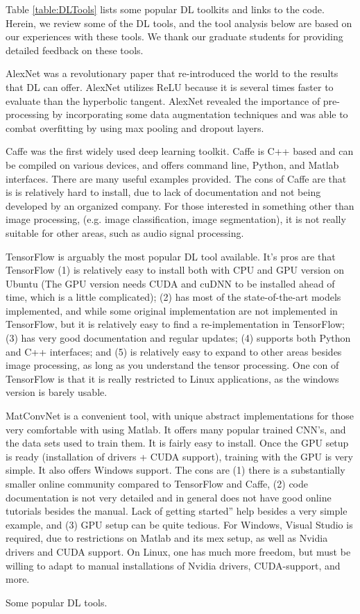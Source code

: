 \documentclass[12pt]{spieman}
\begin{document}
\begin{spacing}{1}
Table \ref{table:DLTools} lists some popular DL toolkits and links to the code. Herein, we review some of the DL tools, and the tool analysis below are based on our experiences with these tools. We thank our graduate students for providing detailed feedback on these tools.

AlexNet \cite{krizhevsky2012imagenet} was a revolutionary paper that re-introduced the world to the results that DL can offer. AlexNet utilizes ReLU because it is several times faster to evaluate than the hyperbolic tangent. AlexNet revealed the importance of pre-processing by incorporating some data augmentation techniques and was able to combat overfitting by using max pooling and dropout layers.

Caffe \cite{Jia2014Caffe} was the first widely used deep learning toolkit. Caffe is C++ based and can be compiled on various devices, and offers command line, Python, and Matlab interfaces. There are many useful examples provided. The cons of Caffe are that is is relatively hard to install, due to lack of documentation and not being developed by an organized company. For those interested in something other than image processing, (e.g. image classification, image segmentation), it is not really suitable for other areas, such as audio signal processing.

TensorFlow \cite{abadi2016tensorflow} is arguably the most popular DL tool available. It's pros are that TensorFlow (1) is relatively easy to install both with CPU and GPU version on Ubuntu (The GPU version needs CUDA and cuDNN to be installed ahead of time, which is a little complicated); (2) has most of the state-of-the-art models implemented, and while some original implementation are not implemented in TensorFlow, but it is relatively easy to find a re-implementation in TensorFlow; (3) has very good documentation and regular updates; (4) supports both Python and C++ interfaces; and (5) is relatively easy to expand to other areas besides image processing, as long as you understand the tensor processing. One con of TensorFlow is that it is really restricted to Linux applications, as the windows version is barely usable.

MatConvNet \cite{vedaldi2015matconvnet} is a convenient tool, with unique abstract implementations for those very comfortable with using Matlab. It offers many popular trained CNN’s, and the data sets used to train them. It is fairly easy to install. Once the GPU setup is ready (installation of drivers + CUDA support), training with the GPU is very simple. It also offers Windows support. The cons are (1) there is a substantially smaller online community compared to TensorFlow and Caffe, (2) code documentation is not very detailed and in general does not have good online tutorials besides the manual. Lack of getting started” help besides a very simple example, and (3) GPU setup can be quite tedious. For Windows, Visual Studio is required, due to restrictions on Matlab and its mex setup, as well as Nvidia drivers and CUDA support. On Linux, one has much more freedom, but must be willing to adapt to manual installations of Nvidia drivers, CUDA-support, and more.
\centering
\caption{Some popular DL tools.}
\label{table:DLTools}


\end{spacing}
\end{document}
